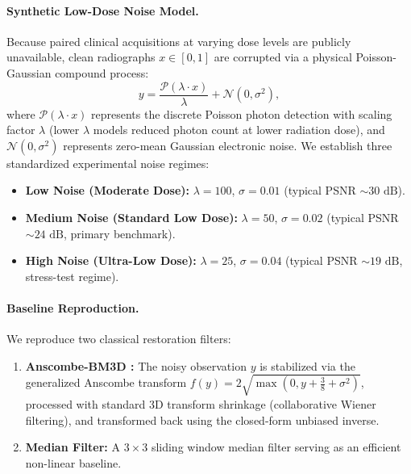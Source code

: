 \documentclass[11pt]{article}
\begin{document}
\paragraph{Synthetic Low-Dose Noise Model.}
Because paired clinical acquisitions at varying dose levels are publicly unavailable, clean radiographs $x \in [0, 1]$ are corrupted via a physical Poisson-Gaussian compound process:
\begin{equation}
  y = \frac{\mathcal{P}(\lambda \cdot x)}{\lambda} + \mathcal{N}(0, \sigma^2),
  \label{eq:noise}
\end{equation}
where $\mathcal{P}(\lambda \cdot x)$ represents the discrete Poisson photon detection with scaling factor $\lambda$ (lower $\lambda$ models reduced photon count at lower radiation dose), and $\mathcal{N}(0, \sigma^2)$ represents zero-mean Gaussian electronic noise. We establish three standardized experimental noise regimes:
\begin{itemize}[leftmargin=*,noitemsep]
  \item \textbf{Low Noise (Moderate Dose):} $\lambda = 100$, $\sigma = 0.01$ (typical PSNR $\sim 30\text{ dB}$).
  \item \textbf{Medium Noise (Standard Low Dose):} $\lambda = 50$, $\sigma = 0.02$ (typical PSNR $\sim 24\text{ dB}$, primary benchmark).
  \item \textbf{High Noise (Ultra-Low Dose):} $\lambda = 25$, $\sigma = 0.04$ (typical PSNR $\sim 19\text{ dB}$, stress-test regime).
\end{itemize}

\paragraph{Baseline Reproduction.}
We reproduce two classical restoration filters:
\begin{enumerate}[leftmargin=*,noitemsep]
  \item \textbf{Anscombe-BM3D \citep{dabov2007bm3d,makitalo2011anscombe}:} The noisy observation $y$ is stabilized via the generalized Anscombe transform $f(y) = 2\sqrt{\max(0, y + \frac{3}{8} + \sigma^2)}$, processed with standard 3D transform shrinkage (collaborative Wiener filtering), and transformed back using the closed-form unbiased inverse.
  \item \textbf{Median Filter:} A $3 \times 3$ sliding window median filter serving as an efficient non-linear baseline.
\end{enumerate}
\end{document}
